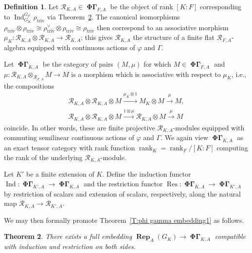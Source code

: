 \documentclass[12pt]{amsart}
\newtheorem{theorem}{Theorem}[section]
\theoremstyle{definition}
\newtheorem{defn}[theorem]{Definition}
\numberwithin{equation}{theorem}
\newcommand{\calR}{\mathcal{R}}
\newcommand{\dual}{\vee}
\DeclareMathOperator{\Ind}{Ind}
\DeclareMathOperator{\PhiGamma}{\mathbf{\Phi \Gamma}}
\DeclareMathOperator{\rank}{rank}
\DeclareMathOperator{\Rep}{\mathbf{Rep}}
\DeclareMathOperator{\Res}{Res}
\DeclareMathOperator{\triv}{triv}
\begin{document}
\begin{defn}
Let $\calR_{K,A} \in \PhiGamma_{F,A}$ be the object of rank $[K:F]$ corresponding to $\Ind^{G_F}_{G_K} \rho_{\triv}$ via Theorem~\ref{T:phi gamma embedding}. The canonical isomorphisms $\rho_{\triv} \otimes \rho_{\triv} \cong \rho_{\triv}^\dual \otimes \rho_{\triv} \cong \rho_{\triv}$
then correspond to an associative morphism $\mu_K: \calR_{K,A} \otimes \calR_{K,A} \to \calR_{K,A}$; this gives $\calR_{K,A}$ the structure of a finite flat $\calR_{F,A}$-algebra equipped with continuous actions of $\varphi$ and $\Gamma$.

Let $\PhiGamma_{K,A}$ be the category of pairs $(M, \mu)$ for which $M \in \PhiGamma_{F,A}$
and $\mu: \calR_{K,A} \otimes_{\calR_{F,A}} M \to M$ is a morphism which is associative with respect to $\mu_K$, i.e., the compositions
\begin{gather*}
\calR_{K,A} \otimes \calR_{K,A}  \otimes M \stackrel{\mu_K \otimes 1}{\to} M_K \otimes M \stackrel{\mu}{\to} M, \\
\calR_{K,A} \otimes \calR_{K,A} \otimes M \stackrel{1 \otimes \mu}{\to} \calR_{K,A} \otimes  M \stackrel{\mu}{\to} M
\end{gather*}
coincide. 
In other words, these are finite projective $\calR_{K,A}$-modules equipped with commuting semilinear continuous actions of $\varphi$ and $\Gamma$.
We again view $\PhiGamma_{K,A}$ as an exact tensor category with rank function $\rank_K = \rank_F / [K:F]$ computing the rank of the underlying $\calR_{K,A}$-module.

Let $K'$ be a finite extension of $K$. Define the induction functor
$\Ind: \PhiGamma_{K',A} \to \PhiGamma_{K,A}$ 
and the restriction functor $\Res: \PhiGamma_{K,A} \to \PhiGamma_{K',A}$
by restriction of scalars and extension of scalars, respectively, along the natural map $\calR_{K,A}  \to \calR_{K',A}$.
\end{defn}

We may then formally promote Theorem~\ref{T:phi gamma embedding1} as follows.
\begin{theorem} \label{T:phi gamma embedding}
There exists a full embedding $\Rep_A(G_K) \to \PhiGamma_{K,A}$ compatible with induction and restriction on both sides.
\end{theorem}
\end{document}
